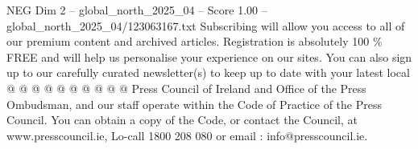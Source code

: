 \begin{textsample}{NEG Dim 2 – global\_north\_2025\_04 – Score 1.00 – global\_north\_2025\_04/123063167.txt}
Subscribing will allow you access to all of our premium content and archived articles.
Registration is absolutely 100 \% FREE and will help us personalise your experience on our sites.
You can also sign up to our carefully curated newsletter(s) to keep up to date with your latest local @ @ @ @ @ @ @ @ @ @ Press Council of Ireland and Office of the Press Ombudsman, and our staff operate within the Code of Practice of the Press Council.
You can obtain a copy of the Code, or contact the Council, at www.presscouncil.ie, Lo-call 1800 208 080 or email : info@presscouncil.ie.

\end{textsample}
